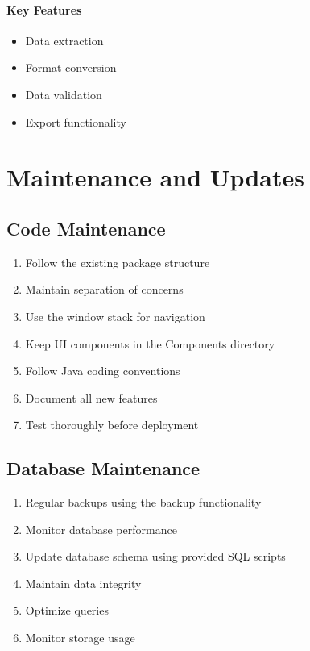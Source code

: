 \documentclass[12pt,a4paper]{article}
\begin{document}
\paragraph{Key Features}
\begin{itemize}
    \item Data extraction
    \item Format conversion
    \item Data validation
    \item Export functionality
\end{itemize}

\section{Maintenance and Updates}

\subsection{Code Maintenance}
\begin{enumerate}
    \item Follow the existing package structure
    \item Maintain separation of concerns
    \item Use the window stack for navigation
    \item Keep UI components in the Components directory
    \item Follow Java coding conventions
    \item Document all new features
    \item Test thoroughly before deployment
\end{enumerate}

\subsection{Database Maintenance}
\begin{enumerate}
    \item Regular backups using the backup functionality
    \item Monitor database performance
    \item Update database schema using provided SQL scripts
    \item Maintain data integrity
    \item Optimize queries
    \item Monitor storage usage
\end{enumerate}
\end{document}
